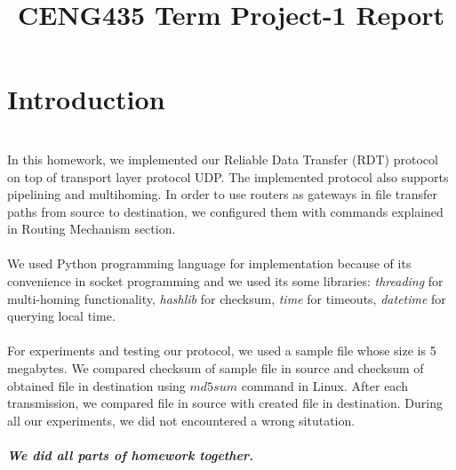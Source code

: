 \documentclass[conference]{IEEEtran}
\begin{document}
\title{CENG435 Term Project-1 Report\\
{\footnotesize}
}

\author{
\and
{}
}

\maketitle
\section{Introduction}\\
In this homework, we implemented our Reliable Data Transfer (RDT) protocol on top of transport layer protocol UDP. The implemented protocol also supports pipelining and multihoming. In order to use routers as gateways in file transfer paths from source to destination, we configured them  with commands explained in Routing Mechanism section. \\
\\
We used Python programming language for implementation because of its convenience in socket programming and we used its some libraries: \textit{threading} for multi-homing functionality, \textit{hashlib} for checksum, \textit{time} for timeouts, \textit{datetime} for querying local time.\\
\\
For experiments and testing our protocol, we used a sample file whose size is 5 megabytes. We compared checksum of sample file in source and  checksum of obtained file in destination using $md5sum$ command in Linux. After each transmission, we compared file in source with created file in destination. During all our experiments, we did not encountered a wrong situtation.\\
\\
\textbf{\textit{We did all parts of homework together.}}
\end{document}
